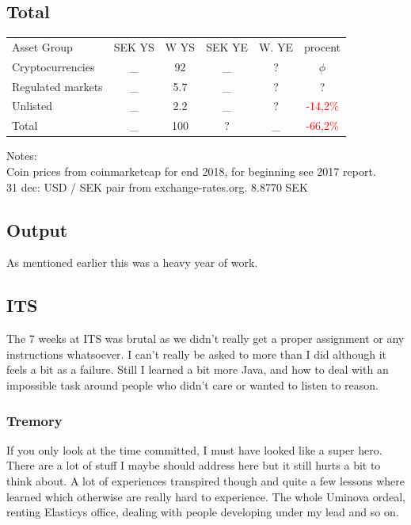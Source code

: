 \documentclass[a4paper]{article}
\begin{document}
	\subsection{Total}
	\begin{tabular}{l|c|c|c|c|c}
		Asset Group & SEK YS & W YS & SEK YE & W. YE & procent \\
		Cryptocurrencies  & \_ & 92  & \_ & ? & $ \phi $ \\
		Regulated markets & \_  & 5.7 & \_  & ? & ? \\
		Unlisted          & \_   & 2.2 & \_   & ? & \textcolor{red}{-14,2\%}  \\
		Total             & \_   & 100 & ?   & \_ & \textcolor{red}{-66,2\%} \\
	\end{tabular}
	
	Notes: \\
	Coin prices from coinmarketcap for end 2018, for beginning see 2017 report. \\
	
	
	31 dec: USD / SEK pair from exchange-rates.org. 8.8770 SEK \\
	
	\subsection{Output}
	
	As mentioned earlier this was a heavy year of work.
	
	\subsection{ITS}
	
	The 7 weeks at ITS was brutal as we didn't really get a proper assignment or any instructions whatsoever.
	I can't really be asked to more than I did although it feels a bit as a failure. Still I learned a bit more
	Java, and how to deal with an impossible task around people who didn't care or wanted to listen to reason.
	
	\subsubsection{Tremory}
	
	If you only look at the time committed, I must have looked like a super hero. There are a lot of stuff I maybe should address here but
	it still hurts a bit to think about. A lot of experiences transpired though and quite a few lessons where learned which otherwise are really hard to experience. The whole Uminova ordeal, renting Elasticys office, dealing with people developing under my lead and so on. 
\end{document}
